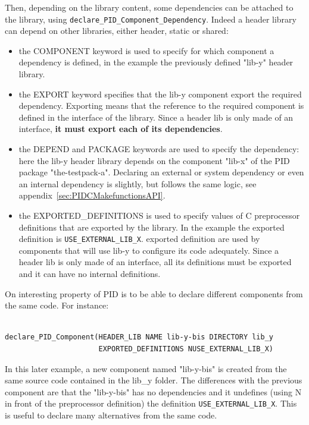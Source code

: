 \documentclass[12pt,a4paper]{article}
\begin{document}
Then, depending on the library content, some dependencies can be attached to the library, using \texttt{declare\_PID\_Component\_Dependency}. Indeed a header library can depend on other libraries, either header, static or shared:
\begin{itemize}
\item the COMPONENT keyword is used to specify for which component a dependency is defined, in the example the previously defined "lib-y" header library.
\item the EXPORT keyword specifies that the lib-y component export the required dependency. Exporting means that the reference to the required component is defined in the interface of the library. Since a header lib is only made of an interface, \textbf{it must export each of its dependencies}.
\item the DEPEND and PACKAGE keywords are used to specify the dependency: here the lib-y header library depends on the component "lib-x" of the PID package "the-testpack-a". Declaring an external or system dependency or even an internal dependency is slightly, but follows the same logic, see appendix~\ref{sec:PIDCMakefunctionsAPI}.
\item the EXPORTED\_DEFINITIONS is used to specify values of C preprocessor definitions that are exported by the library. In the example the exported definition is \texttt{USE\_EXTERNAL\_LIB\_X}. exported definition are used by components that will use lib-y to configure its code adequately. Since a header lib is only made of an interface, all its definitions must be exported and it can have no internal definitions.
\end{itemize}

On interesting property of PID is to be able to declare different components from the same code. For instance:
\begin{verbatim}

declare_PID_Component(HEADER_LIB NAME lib-y-bis DIRECTORY lib_y
                      EXPORTED_DEFINITIONS NUSE_EXTERNAL_LIB_X)

\end{verbatim}

In this later example, a new component named "lib-y-bis" is created from the same source code contained in the lib\_y folder. The differences with the previous component are that the "lib-y-bis" has no dependencies and it undefines (using N in front of the preprocessor definition) the definition \texttt{USE\_EXTERNAL\_LIB\_X}. This is useful to declare many alternatives from the same code.
\end{document}
